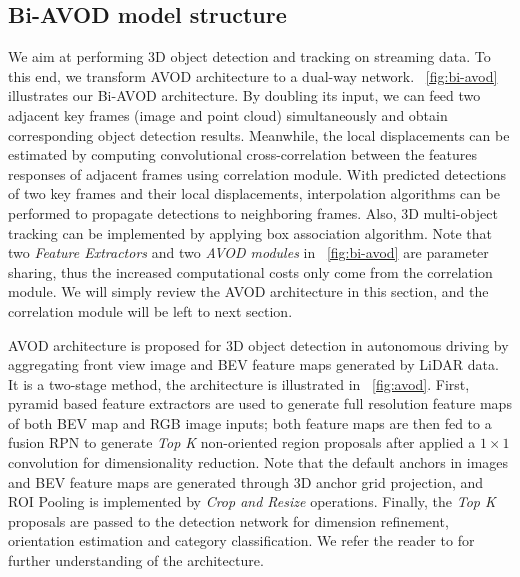 \documentclass{bmvc2k}
\begin{document}
\subsection{Bi-AVOD model structure}
We aim at performing 3D object detection and tracking on streaming data. To this end, we transform AVOD\cite{ku2018joint} architecture to a dual-way network. \figurename \, \ref{fig:bi-avod} illustrates our Bi-AVOD architecture. By doubling its input, we can feed two adjacent key frames (image and point cloud) simultaneously and obtain corresponding object detection results. Meanwhile, the local displacements can be estimated by computing convolutional cross-correlation between the features responses of adjacent frames using correlation module. With predicted detections of two key frames and their local displacements, interpolation algorithms can be performed to propagate detections to neighboring frames. Also, 3D multi-object tracking can be implemented by applying box association algorithm. Note that two \textit{Feature Extractors} and two \textit{AVOD modules} in \figurename \, \ref{fig:bi-avod} are parameter sharing, thus the increased computational costs only come from the correlation module. We will simply review the AVOD architecture in this section, and the correlation module will be left to next section.

AVOD\cite{ku2018joint} architecture is proposed for 3D object detection in autonomous driving by aggregating front view image and BEV feature maps generated by LiDAR data. It is a two-stage method, the architecture is illustrated in \figurename \, \ref{fig:avod}. First, pyramid based feature extractors are used to generate full resolution feature maps of both BEV map and RGB image inputs; both feature maps are then fed to a fusion RPN to generate \textit{Top K} non-oriented region proposals after applied a $1 \times 1$ convolution for dimensionality reduction. Note that the default anchors in images and BEV feature maps are generated through 3D anchor grid projection, and ROI Pooling is implemented by \textit{Crop and Resize} operations. Finally, the \textit{Top K} proposals are passed to the detection network for dimension refinement, orientation estimation and category classification. We refer the reader to \cite{ku2018joint} for further understanding of the architecture.
\end{document}
